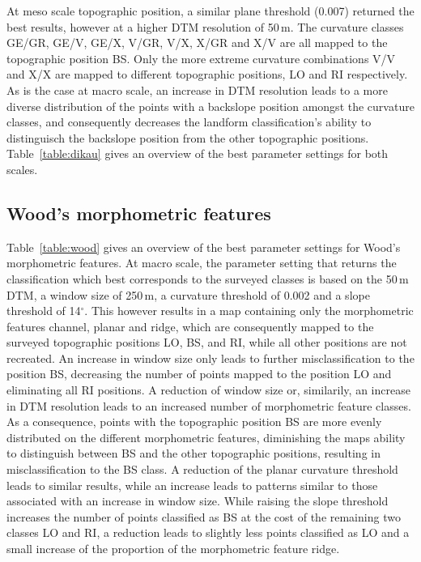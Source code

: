 \documentclass[preprint,12pt,authoryear]{elsarticle}
\begin{document}
At meso scale topographic position, a similar plane threshold (0.007) returned the best results, however at a higher DTM resolution of 50\,m. The curvature classes GE/GR, GE/V, GE/X, V/GR, V/X, X/GR and X/V are all mapped to the topographic position BS. Only the more extreme curvature combinations V/V and X/X are mapped to different topographic positions, LO and RI respectively. As is the case at macro scale, an increase in DTM resolution leads to a more diverse distribution of the points with a backslope position amongst the curvature classes, and consequently decreases the landform classification's ability to distinguisch the backslope position from the other topographic positions. Table~\ref{table:dikau} gives an overview of the best parameter settings for both scales.

\subsection{Wood's morphometric features}
Table~\ref{table:wood} gives an overview of the best parameter settings for Wood's morphometric features.
At macro scale, the parameter setting that returns the classification which best corresponds to the surveyed classes is based on the 50\,m DTM, a window size of 250\,m, a curvature threshold of 0.002 and a slope threshold of 14$^{\circ}$. This however results in a map containing only the morphometric features channel, planar and ridge, which are consequently mapped to the surveyed topographic positions LO, BS, and RI, while all other positions are not recreated. An increase in window size only leads to further misclassification to the position BS, decreasing the number of points mapped to the position LO and eliminating all RI positions. A reduction of window size or, similarily, an increase in DTM resolution leads to an increased number of morphometric feature classes. As a consequence, points with the topographic position BS are more evenly distributed on the different morphometric features, diminishing the maps ability to distinguish between BS and the other topographic positions, resulting in misclassification to the BS class. A reduction of the planar curvature threshold leads to similar results, while an increase leads to patterns similar to those associated with an increase in window size. While raising the slope threshold increases the number of points classified as BS at the cost of the remaining two classes LO and RI, a reduction leads to slightly less points classified as LO and a small increase of the proportion of the morphometric feature ridge. 
\end{document}
